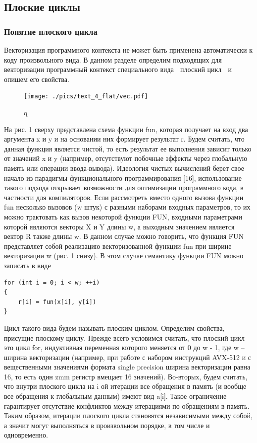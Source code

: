 \subsection{Плоские циклы}

\subsubsection{Понятие плоского цикла}

Векторизация программного контекста не может быть применена автоматически к коду произвольного вида.
В данном разделе определим подходящих для векторизации программный контекст специального вида  плоский цикл  и опишем его свойства.

\begin{figure}[ht]
\centering
\texttt{[image: ./pics/text\_4\_flat/vec.pdf]}
\caption{q}
\label{lab}
\end{figure}

На рис. 1 сверху представлена схема функции fun, которая получает на вход два аргумента x и y и на основании них формирует результат r.
Будем считать, что данная функция является чистой, то есть результат ее выполнения зависит только от значений x и y (например, отсутствуют побочные эффекты через глобальную память или операции ввода-вывода).
Идеология чистых вычислений берет свое начало из парадигмы функционального программирования [16], использование такого подхода открывает возможности для оптимизации программного кода, в частности для компиляторов.
Если рассмотреть вместо одного вызова функции fun несколько вызовов (w штук) с разными наборами входных параметров, то их можно трактовать как вызов некоторой функции FUN, входными параметрами которой являются векторы X и Y длины w, а выходным значением является вектор R также длины w.
В данном случае можно говорить, что функция FUN представляет собой реализацию векторизованной функции fun при ширине векторизации w (рис. 1 снизу).
В этом случае семантику функции FUN можно записать в виде

\begin{lstlisting}[caption={caption},label={label}]
for (int i = 0; i < w; ++i)
{
    r[i] = fun(x[i], y[i])
}
\end{lstlisting}

Цикл такого вида будем называть плоским циклом.
Определим свойства, присущие плоскому циклу.
Прежде всего условимся считать, что плоский цикл это цикл for, индуктивная переменная которого меняется от 0 до w - 1, где w -- ширина векторизации (например, при работе с набором инструкций AVX-512 и с вещественными значениями формата single precision ширина векторизации равна 16, то есть один zmm регистр вмещает 16 значений).
Во-вторых, будем считать, что внутри плоского цикла на i ой итерации все обращения в память (и вообще все обращения к глобальным данным) имеют вид a[i].
Такое ограничение гарантирует отсутствие конфликтов между итерациями по обращениям в память. Таким образом, итерации плоского цикла становятся независимыми между собой, а значит могут выполняться в произвольном порядке, в том числе и одновременно.

